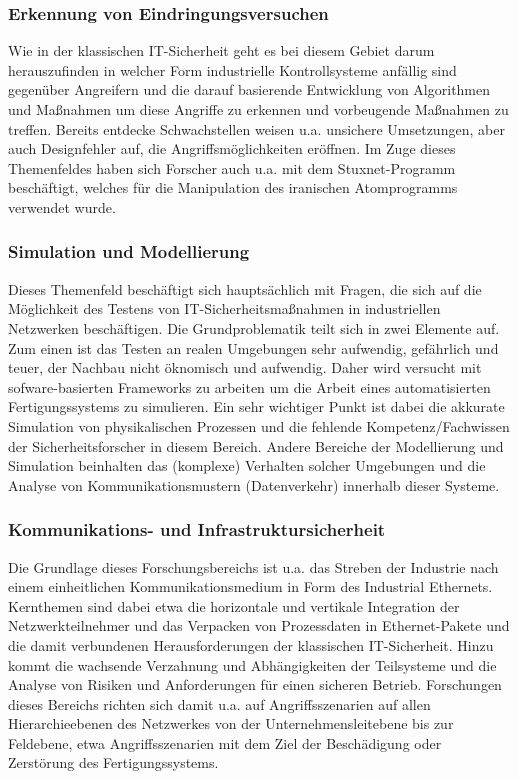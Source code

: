 \subsubsection{Erkennung von Eindringungsversuchen}
Wie in der klassischen IT-Sicherheit geht es bei diesem Gebiet darum herauszufinden in welcher Form industrielle Kontrollsysteme anfällig sind gegenüber Angreifern und die darauf basierende Entwicklung von Algorithmen und Maßnahmen um diese Angriffe zu erkennen und vorbeugende Maßnahmen zu treffen. Bereits entdecke Schwachstellen weisen u.a. unsichere Umsetzungen, aber auch Designfehler auf, die Angriffsmöglichkeiten eröffnen. Im Zuge dieses Themenfeldes haben sich Forscher auch u.a. mit dem Stuxnet-Programm beschäftigt, welches für die Manipulation des iranischen Atomprogramms verwendet wurde.

\subsubsection{Simulation und Modellierung}
Dieses Themenfeld beschäftigt sich hauptsächlich mit Fragen, die sich auf die Möglichkeit des Testens von IT-Sicherheitsmaßnahmen in industriellen Netzwerken beschäftigen. Die Grundproblematik teilt sich in zwei Elemente auf. Zum einen ist das Testen an realen Umgebungen sehr aufwendig, gefährlich und teuer, der Nachbau nicht öknomisch und aufwendig. Daher wird versucht mit sofware-basierten Frameworks zu arbeiten um die Arbeit eines automatisierten Fertigungssystems zu simulieren. Ein sehr wichtiger Punkt ist dabei die akkurate Simulation von physikalischen Prozessen und die fehlende Kompetenz/Fachwissen der Sicherheitsforscher in diesem Bereich. Andere Bereiche der Modellierung und Simulation beinhalten das (komplexe) Verhalten solcher Umgebungen und die Analyse von Kommunikationsmustern (Datenverkehr) innerhalb dieser Systeme.

\subsubsection{Kommunikations- und Infrastruktursicherheit}
Die Grundlage dieses Forschungsbereichs ist u.a. das Streben der Industrie nach einem einheitlichen Kommunikationsmedium in Form des Industrial Ethernets. Kernthemen sind dabei etwa die horizontale und vertikale Integration der Netzwerkteilnehmer und das Verpacken von Prozessdaten in Ethernet-Pakete und die damit verbundenen Herausforderungen der klassischen IT-Sicherheit. Hinzu kommt die wachsende Verzahnung und Abhängigkeiten der Teilsysteme und die Analyse von Risiken und Anforderungen für einen sicheren Betrieb. Forschungen dieses Bereichs richten sich damit u.a. auf Angriffsszenarien auf allen Hierarchieebenen des Netzwerkes von der Unternehmensleitebene bis zur Feldebene, etwa Angriffsszenarien mit dem Ziel der Beschädigung oder Zerstörung des Fertigungssystems.


